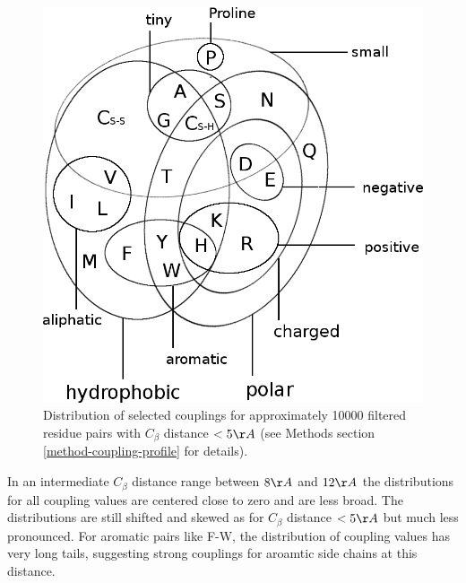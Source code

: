 \documentclass[12pt,a4paper,twoside]{book}
\newcommand{\Cb}{C_\beta}
\theoremstyle{definition}
\theoremstyle{definition}
\theoremstyle{remark}
\begin{document}
\begin{figure}
\includegraphics[width=1\linewidth]{img/amino_acid_physico_chemical_properties_venn_diagramm} \caption{Distribution of selected couplings
for approximately 10000 filtered residue pairs with \(\Cb\) distance
\(< 5\AA\) (see Methods section \ref{method-coupling-profile} for
details).}\label{fig:1d-coupling-profile-0-5}
\end{figure}

In an intermediate \(\Cb\) distance range between \(8\AA\) and \(12\AA\)
the distributions for all coupling values are centered close to zero and
are less broad. The distributions are still shifted and skewed as for
\(\Cb\) distance \(< 5\AA\) but much less pronounced. For aromatic pairs
like F-W, the distribution of coupling values has very long tails,
suggesting strong couplings for aroamtic side chains at this distance.
\end{document}
